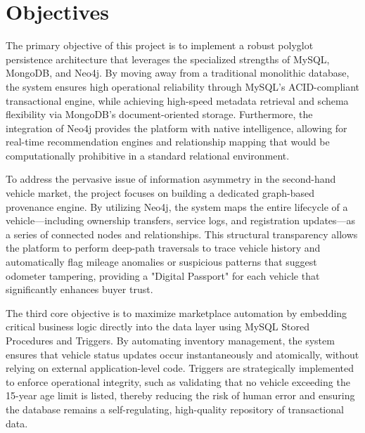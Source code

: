 \documentclass[12pt,a4paper]{report}
\begin{document}
\section{Objectives}
\begin{description}[leftmargin=0em, itemsep=1.5em]
    \item[Technical Innovation through Polyglot Architecture:] The primary objective of this project is to implement a robust polyglot persistence architecture that leverages the specialized strengths of MySQL, MongoDB, and Neo4j. By moving away from a traditional monolithic database, the system ensures high operational reliability through MySQL’s ACID-compliant transactional engine, while achieving high-speed metadata retrieval and schema flexibility via MongoDB’s document-oriented storage. Furthermore, the integration of Neo4j provides the platform with native intelligence, allowing for real-time recommendation engines and relationship mapping that would be computationally prohibitive in a standard relational environment.

    \item[Fraud Prevention and Graph-Based Provenance:] To address the pervasive issue of information asymmetry in the second-hand vehicle market, the project focuses on building a dedicated graph-based provenance engine. By utilizing Neo4j, the system maps the entire lifecycle of a vehicle—including ownership transfers, service logs, and registration updates—as a series of connected nodes and relationships. This structural transparency allows the platform to perform deep-path traversals to trace vehicle history and automatically flag mileage anomalies or suspicious patterns that suggest odometer tampering, providing a "Digital Passport" for each vehicle that significantly enhances buyer trust.

    \item[Marketplace Automation and Operational Integrity:] The third core objective is to maximize marketplace automation by embedding critical business logic directly into the data layer using MySQL Stored Procedures and Triggers. By automating inventory management, the system ensures that vehicle status updates occur instantaneously and atomically, without relying on external application-level code. Triggers are strategically implemented to enforce operational integrity, such as validating that no vehicle exceeding the 15-year age limit is listed, thereby reducing the risk of human error and ensuring the database remains a self-regulating, high-quality repository of transactional data.
\end{description}
\end{document}
